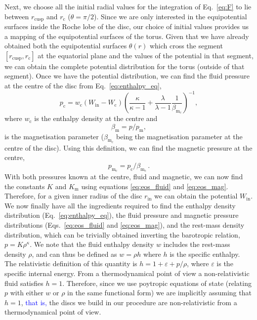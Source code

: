 \documentclass{aa}
\newcommand{\sg}[1]{\textcolor{blue}{#1}}
\begin{document}
Next, we choose all the initial radial values for the integration of Eq.~\eqref{eq:F} to lie between $r_{\mathrm{cusp}}$ and $r_{\mathrm{c}}$ ($\theta = \pi / 2$). Since we are only interested in the equipotential surfaces inside the Roche lobe of the disc, our choice of initial values provides us a mapping of the equipotential surfaces of the torus. Given that we have already obtained both the equipotential surfaces $\theta(r)$ which cross the segment $[r_{\mathrm{cusp}}, r_{\mathrm{c}}]$ at the equatorial plane and the values of the potential in that segment, we can obtain the complete potential distribution for the torus (outside of that segment). Once we have the potential distribution, we can find the fluid pressure at the centre of the disc from Eq.~\eqref{eq:enthalpy_eq},
\begin{equation}
p_{\mathrm{c}} = w_{\mathrm{c}}(W_{\mathrm{in}} - W_{\mathrm{c}})\left(\frac{\kappa}{\kappa - 1} + \frac{\lambda
}{\lambda
 - 1}\frac{1}{\beta_{\mathrm{m}_{\mathrm{c}}}}\right)^{-1},
\end{equation}
where $w_{\mathrm{c}}$ is the enthalpy density at the centre and
\begin{equation}
\label{eq:beta_eq}
\beta_{\mathrm{m}} = p/p_{\mathrm{m}},
\end{equation}
is the magnetisation parameter ($\beta_{\mathrm{m}_{\mathrm{c}}}$ being the magnetisation parameter at the centre of the disc). Using this definition, we can find the magnetic pressure at the centre,
\begin{equation}
p_{\mathrm{m_{\mathrm{c}}}} = p_{\mathrm{c}}/\beta_{\mathrm{m}_{\mathrm{c}}}\,.
\end{equation}
With both pressures known at the centre, fluid and magnetic, we can now find the constants $K$ and $K_{\mathrm{m}}$ using equations \eqref{eq:eos_fluid} and \eqref{eq:eos_mag}. Therefore, for a given inner radius of the disc $r_{\mathrm{in}}$ we can obtain the potential $W_{\mathrm{in}}$. We now finally have all the ingredients required to find the enthalpy density distribution (Eq.~\eqref{eq:enthalpy_eq}), the fluid pressure and magnetic pressure distributions (Eqs.~\eqref{eq:eos_fluid} and \eqref{eq:eos_mag}), and the rest-mass density distribution, which can be trivially obtained inverting the barotropic relation, $p = K \rho^{\kappa}$. We note that the fluid enthalpy density $w$ includes the rest-mass density $\rho$, and can thus be defined as $w=\rho h$ where $h$ is the specific enthalpy. The relativistic definition of this quantity is $h=1+\varepsilon+p/\rho$, where $\varepsilon$ is
the specific internal energy. From a thermodynamical point of view a non-relativistic fluid satisfies $h=1$. Therefore,
since we use poytropic equations of state (relating $p$ with either $w$ or $\rho$ in the same functional form) we are
implicitly assuming that $h=1$, \sg{that is,} the discs we build in our procedure are non-relativistic from a thermodynamical point of view.
\end{document}
